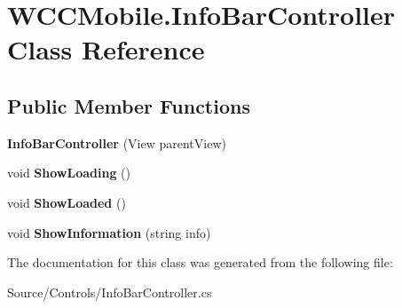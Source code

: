 \hypertarget{class_w_c_c_mobile_1_1_info_bar_controller}{}\section{W\+C\+C\+Mobile.\+Info\+Bar\+Controller Class Reference}
\label{class_w_c_c_mobile_1_1_info_bar_controller}
\subsection*{Public Member Functions}
\begin{DoxyCompactItemize}
\item 
{\bfseries Info\+Bar\+Controller} (View parent\+View)\hypertarget{class_w_c_c_mobile_1_1_info_bar_controller_abbcd4a83b1ac3c04d42f1711080e37d7}{}\label{class_w_c_c_mobile_1_1_info_bar_controller_abbcd4a83b1ac3c04d42f1711080e37d7}

\item 
void {\bfseries Show\+Loading} ()\hypertarget{class_w_c_c_mobile_1_1_info_bar_controller_a182c560ef03faf572837bbdef759bdbc}{}\label{class_w_c_c_mobile_1_1_info_bar_controller_a182c560ef03faf572837bbdef759bdbc}

\item 
void {\bfseries Show\+Loaded} ()\hypertarget{class_w_c_c_mobile_1_1_info_bar_controller_a8d66dad968254e4c960f642d655ac332}{}\label{class_w_c_c_mobile_1_1_info_bar_controller_a8d66dad968254e4c960f642d655ac332}

\item 
void {\bfseries Show\+Information} (string info)\hypertarget{class_w_c_c_mobile_1_1_info_bar_controller_aa74dd49a96e71c6a87476755c4a58709}{}\label{class_w_c_c_mobile_1_1_info_bar_controller_aa74dd49a96e71c6a87476755c4a58709}

\end{DoxyCompactItemize}


The documentation for this class was generated from the following file\+:\begin{DoxyCompactItemize}
\item 
Source/\+Controls/Info\+Bar\+Controller.\+cs\end{DoxyCompactItemize}
